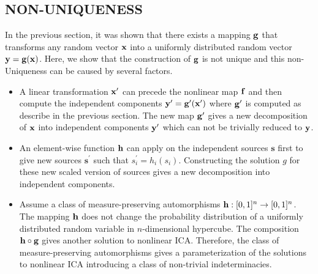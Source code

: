 \documentclass[letterpaper]{article}
\theoremstyle{definition}
\begin{document}
\subsection{NON-UNIQUENESS}
In the previous section, it was shown that there exists a mapping $\mathbf{g}$ that transforms any random vector $\mathbf{x}$ into a uniformly distributed random vector $\mathbf{y}=\mathbf{g}(\mathbf{x})$. Here, we show that the construction of $\mathbf{g}$ is not unique and this non-Uniqueness can be caused by several factors.
\begin{itemize}
    \item A linear transformation $\mathbf{x}^\prime$ can precede the nonlinear map $\mathbf{f}$ and then compute the independent components $\mathbf{y}^\prime=\mathbf{g}^\prime(\mathbf{x}^\prime)$ where $\mathbf{g}^\prime$ is computed as describe in the previous section. The new map $\mathbf{g}^\prime$ gives a new decomposition of $\mathbf{x}$ into independent components $\mathbf{y}^\prime$ which can not be trivially reduced to $\mathbf{y}$.
    \item An element-wise function $\mathbf{h}$ can apply on the independent sources $\bm{s}$ first to give new sources $\bm{s}^\prime$ such that $s_i^\prime=h_i(s_i)$. Constructing the solution $g$ for these new scaled version of sources gives a new decomposition into independent components.
    \item Assume a class of measure-preserving automorphisms $\mathbf{h}:[0,1]^n\to [0,1]^n$. The mapping $\mathbf{h}$ does not change the probability distribution of a uniformly distributed random variable in $n$-dimensional hypercube. The composition $\mathbf{h}\circ\mathbf{g}$ gives another solution to nonlinear ICA. Therefore, the class of measure-preserving automorphisms gives a parameterization of the solutions to nonlinear ICA introducing a class of non-trivial indeterminacies.
\end{itemize}
\end{document}
